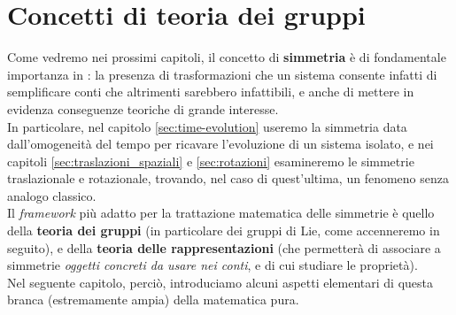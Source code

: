 \documentclass[../../FisicaTeorica.tex]{subfiles}
\begin{document}
\section{Concetti di teoria dei gruppi}
Come vedremo nei prossimi capitoli, il concetto di \textbf{simmetria} è di fondamentale importanza in \MQ: la presenza di trasformazioni che  un sistema consente infatti di semplificare conti che altrimenti sarebbero infattibili, e anche di mettere in evidenza conseguenze teoriche di grande interesse.\\
In particolare, nel capitolo \ref{sec:time-evolution} useremo la simmetria data dall'omogeneità del tempo per ricavare l'evoluzione di un sistema isolato, e nei capitoli \ref{sec:traslazioni_spaziali} e \ref{sec:rotazioni} esamineremo le simmetrie traslazionale e rotazionale, trovando, nel caso di quest'ultima, un fenomeno senza analogo classico.\\
Il \textit{framework} più adatto per la trattazione matematica delle simmetrie è quello della \textbf{teoria dei gruppi} (in particolare dei gruppi di Lie, come accenneremo in seguito), e della \textbf{teoria delle rappresentazioni} (che permetterà di associare a simmetrie  \textit{oggetti concreti da usare nei conti}, e di cui studiare le proprietà).\\
Nel seguente capitolo, perciò, introduciamo alcuni aspetti elementari di questa branca (estremamente ampia) della matematica pura.
\end{document}
